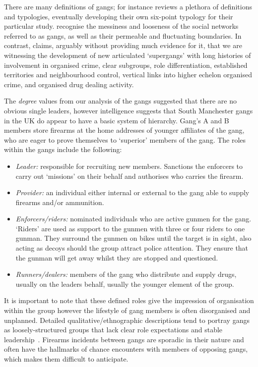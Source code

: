 \documentclass[twocolumn]{svjour3}          %
\theoremstyle{definition}
\begin{document}
There are many definitions of gangs; for instance \citet{pitts:2007}
reviews a plethora of definitions and typologies, eventually
developing their own six-point typology for their particular
study. \citet{aldridge-et-al:2008} recognise the messiness and
looseness of the social networks referred to as gangs, as well as
their permeable and fluctuating boundaries.  In contrast,
\citet{pitts:2008} claims, arguably without providing much evidence
for it, that we are witnessing the development of new articulated
`supergangs' with long histories of involvement in organised crime,
clear subgroups, role differentiation, established territories and
neighbourhood control, vertical links into higher echelon organised
crime, and organised drug dealing activity.

The \emph{degree} values from our analysis of the gangs suggested
that there are no obvious single leaders, however intelligence
suggests that South Manchester gangs in the UK do appear to have a
basic system of hierarchy. Gang's A and B members store firearms at
the home addresses of younger affiliates of the gang, who are eager to
prove themselves to `superior' members of the gang. The roles within
the gangs include the following:

\begin{itemize}
\item \emph{Leader:} responsible for recruiting new members.
Sanctions the enforcers to carry out `missions' on their behalf and
authorises who carries the firearm.
\item \emph{Provider:} an individual either internal or external to
the gang able to supply firearms and/or ammunition.
\item \emph{Enforcers/riders:} nominated individuals who are active
gunmen for the gang. `Riders' are used as support to the gunmen with
three or four riders to one gunman.  They surround the gunmen on bikes
until the target is in sight, also acting as decoys should the group
attract police attention. They ensure that the gunman will get away
whilst they are stopped and questioned.
\item \emph{Runners/dealers:} members of the gang who distribute and
supply drugs, usually on the leaders behalf, usually the younger
element of the group.
\end{itemize}
  
It is important to note that these defined roles give the impression
of organisation within the group however the lifestyle of gang members
is often disorganised and unplanned. Detailed qualitative/ethnographic
descriptions tend to portray gangs as loosely-structured groups that
lack clear role expectations and stable
leadership~\citep{hughes:2005}. Firearms incidents between gangs are
sporadic in their nature and often have the hallmarks of chance
encounters with members of opposing gangs, which makes them difficult
to anticipate.
\end{document}

